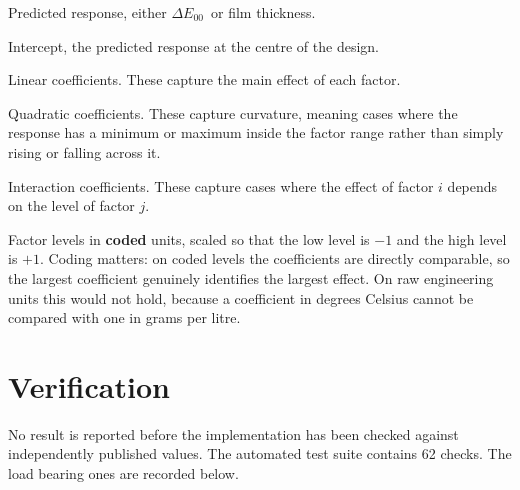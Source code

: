 \documentclass[11pt,a4paper]{article}
\newcommand{\dE}{\ensuremath{\Delta E_{00}}}
\newenvironment{symlist}
  {\vspace{-0.2em}\begin{list}{}{%
    \setlength{\leftmargin}{2.4em}\setlength{\labelwidth}{2.0em}%
    \setlength{\labelsep}{0.4em}\setlength{\itemsep}{1pt}%
    \setlength{\parsep}{0pt}\setlength{\topsep}{3pt}%
    \renewcommand{\makelabel}[1]{##1\hfil}}}
  {\end{list}}
\begin{document}
\begin{symlist}
\item[$y$] Predicted response, either \dE\ or film thickness.
\item[$b_0$] Intercept, the predicted response at the centre of the design.
\item[$b_i$] Linear coefficients. These capture the main effect of each factor.
\item[$b_{ii}$] Quadratic coefficients. These capture curvature, meaning cases
where the response has a minimum or maximum inside the factor range rather than
simply rising or falling across it.
\item[$b_{ij}$] Interaction coefficients. These capture cases where the effect
of factor $i$ depends on the level of factor $j$.
\item[$x_i$] Factor levels in \textbf{coded} units, scaled so that the low
level is $-1$ and the high level is $+1$. Coding matters: on coded levels the
coefficients are directly comparable, so the largest coefficient genuinely
identifies the largest effect. On raw engineering units this would not hold,
because a coefficient in degrees Celsius cannot be compared with one in grams
per litre.
\end{symlist}

\section{Verification}

No result is reported before the implementation has been checked against
independently published values. The automated test suite contains 62 checks.
The load bearing ones are recorded below.
\end{document}
